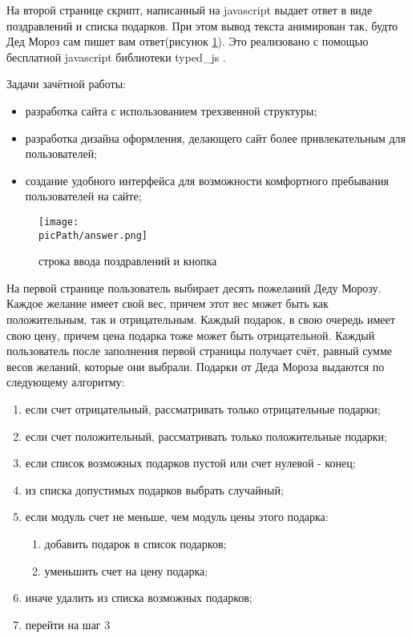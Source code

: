 \documentclass[oneside,final,14pt]{extreport}
\newcommand{\picPath}{pictures}
\begin{document}
На второй странице скрипт, написанный на javascript \cite{bib:js} выдает ответ в виде поздравлений и списка подарков. При этом вывод текста анимирован так, будто Дед Мороз сам пишет вам ответ(рисунок \ref{site:answer}). Это реализовано с помощью бесплатной  javascript библиотеки typed\_js \cite{bib:typed_js}. 

Задачи зачётной работы:
\begin{itemize}
\item  разработка сайта с использованием трехзвенной структуры;
\item разработка дизайна оформления, делающего сайт более привлекательным для пользователей;
\item  создание удобного интерфейса для возможности комфортного пребывания пользователей на сайте;
\end{itemize}    
   


\begin{figure}[H]
	\centering
	\texttt{[image: \\picPath/answer.png]}
	\caption{ строка ввода поздравлений и кнопка }
  	\label{site:answer}
\end{figure}

На первой странице пользователь выбирает десять пожеланий Деду Морозу. Каждое желание имеет свой вес, причем этот вес может быть как положительным, так и отрицательным. Каждый подарок, в свою очередь имеет свою цену, причем цена подарка тоже может быть отрицательной. Каждый пользователь после заполнения первой страницы получает счёт, равный сумме весов желаний, которые они выбрали. Подарки от Деда Мороза выдаются по следующему алгоритму:

\begin{enumerate}
\item если счет отрицательный, рассматривать только отрицательные подарки;
\item если счет положительный, рассматривать только положительные подарки;
\item если список возможных подарков пустой или счет нулевой - конец;
\item из списка допустимых подарков выбрать случайный;
\item если модуль счет не меньше, чем модуль цены этого подарка:
\begin{enumerate}
\item добавить подарок в список подарков;
\item уменьшить счет на цену подарка;
\end{enumerate}
\item иначе удалить из списка возможных подарков;
\item перейти на шаг 3
\end{enumerate}
\end{document}
